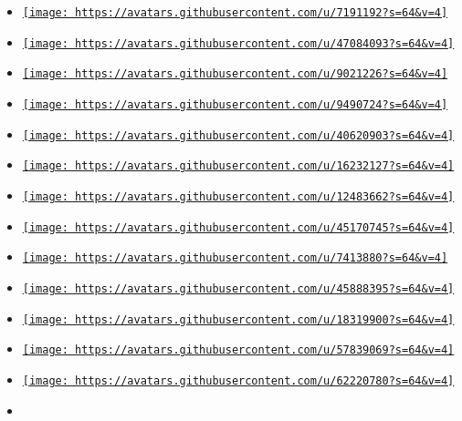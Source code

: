 \begin{itemize}
\tightlist
\item
  \href{https://github.com/EpicEricEE}{\texttt{[image: https://avatars.githubusercontent.com/u/7191192?s=64\&v=4]}}
\item
  \href{https://github.com/LaurenzV}{\texttt{[image: https://avatars.githubusercontent.com/u/47084093?s=64\&v=4]}}
\item
  \href{https://github.com/PgBiel}{\texttt{[image: https://avatars.githubusercontent.com/u/9021226?s=64\&v=4]}}
\item
  \href{https://github.com/SUPERCILEX}{\texttt{[image: https://avatars.githubusercontent.com/u/9490724?s=64\&v=4]}}
\item
  \href{https://github.com/figsoda}{\texttt{[image: https://avatars.githubusercontent.com/u/40620903?s=64\&v=4]}}
\item
  \href{https://github.com/lynn}{\texttt{[image: https://avatars.githubusercontent.com/u/16232127?s=64\&v=4]}}
\item
  \href{https://github.com/peng1999}{\texttt{[image: https://avatars.githubusercontent.com/u/12483662?s=64\&v=4]}}
\item
  \href{https://github.com/sandalbanditten}{\texttt{[image: https://avatars.githubusercontent.com/u/45170745?s=64\&v=4]}}
\item
  \href{https://github.com/BasixKOR}{\texttt{[image: https://avatars.githubusercontent.com/u/7413880?s=64\&v=4]}}
\item
  \href{https://github.com/JettChenT}{\texttt{[image: https://avatars.githubusercontent.com/u/45888395?s=64\&v=4]}}
\item
  \href{https://github.com/Leedehai}{\texttt{[image: https://avatars.githubusercontent.com/u/18319900?s=64\&v=4]}}
\item
  \href{https://github.com/MDLC01}{\texttt{[image: https://avatars.githubusercontent.com/u/57839069?s=64\&v=4]}}
\item
  \href{https://github.com/StrangeGirlMurph}{\texttt{[image: https://avatars.githubusercontent.com/u/62220780?s=64\&v=4]}}
\item

\end{itemize}

